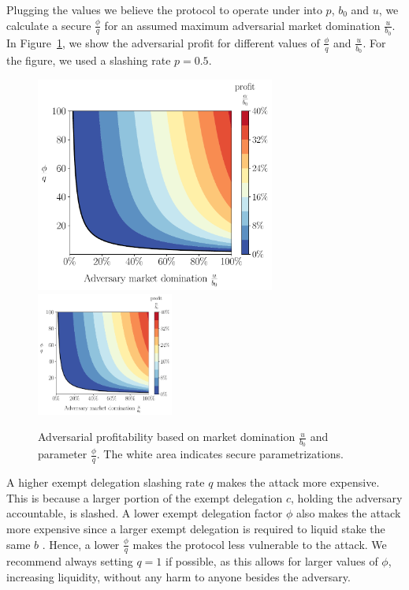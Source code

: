 Plugging the values we believe the protocol to operate under into
$p$, $b_0$ and $u$, we calculate a secure
$\frac{\phi}{q}$ for an assumed maximum adversarial market domination $\frac{u}{b_0}$.
In Figure~\ref{fig:contour-plotu}, we show the adversarial profit for
different values of $\frac{\phi}{q}$ and $\frac{u}{b_0}$.
For the figure, we used a slashing rate $p = 0.5$.


\begin{figure}[htb]
  \centering
  \iflncs
    \includegraphics[width=0.7\textwidth]{./figures/plotu.pdf}
  \fi
  \ifccs
    \includegraphics[width=0.4\textwidth]{./figures/plotu.pdf}
  \fi
  \caption{Adversarial profitability based on market domination
            $\frac{u}{b_0}$ and parameter $\frac{\phi}{q}$.
            The white area indicates secure parametrizations.}
  \label{fig:contour-plotu}
\end{figure}


A higher exempt delegation slashing rate $q$ makes the attack more expensive. This
is because a larger portion of the exempt delegation $c$, holding the adversary accountable,
is slashed. A lower exempt delegation factor $\phi$ also makes the attack more expensive
since a larger exempt delegation is required to liquid stake the same $b$ \asset.
Hence, a lower $\frac{\phi}{q}$ makes the protocol less vulnerable to the attack.
We recommend always setting $q = 1$ if possible, as this allows for
larger values of $\phi$, increasing liquidity, without any harm to anyone
besides the adversary.


